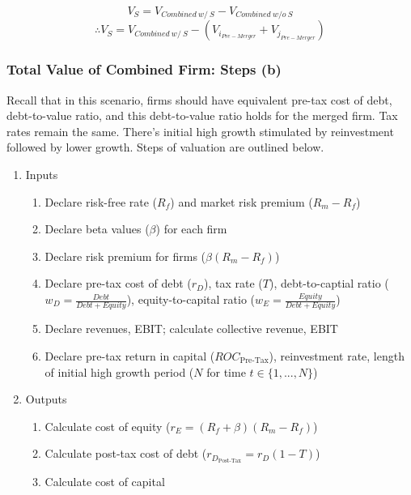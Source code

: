 \documentclass[11pt, english]{article}
\begin{document}
        $$V_S=V_{Combined\ w/\ S}-V_{Combined\ w/o\ S}$$
        $$\therefore V_S=V_{Combined\ w/\ S}-(V_{i_{Pre-Merger}}+V_{j_{Pre-Merger}})$$

                \subsubsection*{Total Value of Combined Firm: Steps (b)}

        Recall that in this scenario, firms should have equivalent pre-tax cost of debt, debt-to-value ratio, and this debt-to-value ratio holds for the merged firm. Tax rates remain the same. There's initial high growth stimulated by reinvestment followed by lower growth. Steps of valuation are outlined below.

	\begin{enumerate}
	\setlength\itemsep{0cm}
                \item Inputs
                \begin{enumerate}
                        \item Declare risk-free rate ($R_f$) and market risk premium ($R_m-R_f$)
                        \item Declare beta values ($\beta$) for each firm
                        \item Declare risk premium for firms ($\beta(R_m-R_f)$)
                        \item Declare pre-tax cost of debt ($r_D$), tax rate ($T$), debt-to-captial ratio ($w_D=\frac{Debt}{Debt+Equity}$), equity-to-capital ratio ($w_E=\frac{Equity}{Debt+Equity}$)
                        \item Declare revenues, EBIT; calculate collective revenue, EBIT
                        \item Declare pre-tax return in capital ($ROC_{\textrm{Pre-Tax}}$), reinvestment rate, length of initial high growth period ($N$ for time $t\in\{1,...,N\}$)
                \end{enumerate}
                \item Outputs
                \begin{enumerate}
                        \item Calculate cost of equity ($r_E=(R_f+\beta)(R_m-R_f)$)
                        \item Calculate post-tax cost of debt ($r_{D_{\textrm{Post-Tax}}}=r_D(1-T)$)
                        \item Calculate cost of capital
                        \begin{enumerate}

\end{enumerate}
\end{enumerate}
\end{enumerate}
\end{document}
